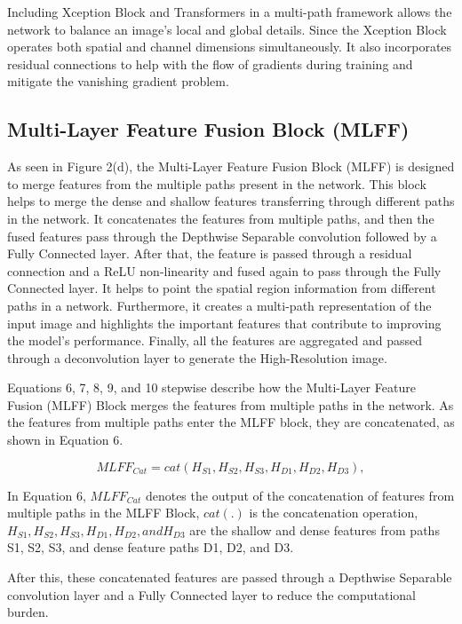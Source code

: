 \documentclass[twocolumn]{svjour3}          %
\begin{document}
Including Xception Block and Transformers in a multi-path framework allows the network to balance an image's local and global details. Since the Xception Block operates both spatial and channel dimensions simultaneously. It also incorporates residual connections to help with the flow of gradients during training and mitigate the vanishing gradient problem. 

\subsection{Multi-Layer Feature Fusion Block (MLFF)}

As seen in Figure 2(d), the Multi-Layer Feature Fusion Block (MLFF) is designed to merge features from the multiple paths present in the network. This block helps to merge the dense and shallow features transferring through different paths in the network. It concatenates the features from multiple paths, and then the fused features pass through the Depthwise Separable convolution followed by a Fully Connected layer. After that, the feature is passed through a residual connection and a ReLU non-linearity and fused again to pass through the Fully Connected layer. It helps to point the spatial region information from different paths in a network. Furthermore, it creates a multi-path representation of the input image and highlights the important features that contribute to improving the model's performance. Finally, all the features are aggregated and passed through a deconvolution layer to generate the High-Resolution image.

Equations 6, 7, 8, 9, and 10 stepwise describe how the Multi-Layer Feature Fusion (MLFF) Block merges the features from multiple paths in the network. As the features from multiple paths enter the MLFF block, they are concatenated, as shown in Equation 6.

\begin{equation}
{MLFF_{Cat}}= {cat}({H_{S1}},{H_{S2}},{H_{S3}},{H_{D1}},{H_{D2}},{H_{D3}}),
\end{equation}

In Equation 6, ${MLFF_{Cat}}$ denotes the output of the concatenation of features from multiple paths in the MLFF Block, ${cat}$$(.)$ is the concatenation operation, ${H_{S1}},{H_{S2}},{H_{S3}},{H_{D1}},{H_{D2}}, and {H_{D3}}$ are the shallow and dense features from paths S1, S2, S3, and dense feature paths D1, D2, and D3. 

After this, these concatenated features are passed through a Depthwise Separable convolution layer and a Fully Connected layer to reduce the computational burden.
\end{document}
